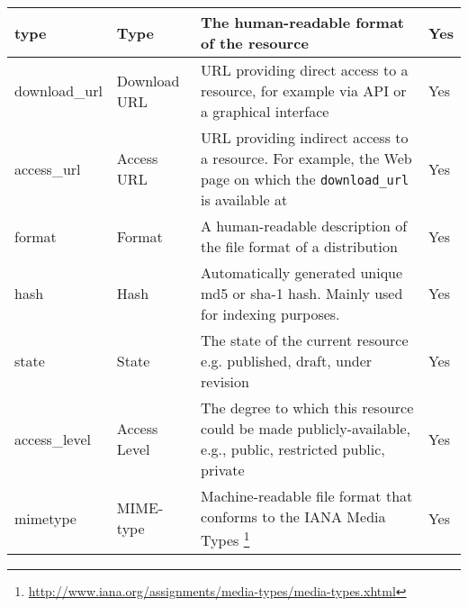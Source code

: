 \begin{center}
{\begin{longtable}[h]{|l|p{2cm}|p{9cm}|c|}
\endlastfoot
type                              & Type                             & The human-readable format of the resource                                                                                                                                                      & \multicolumn{1}{l|}{Yes}            \\ \hline
download\_url                     & Download URL                     & URL providing direct access to a resource, for example via API or a graphical interface                                                                                                         & \multicolumn{1}{l|}{Yes}            \\ \hline
access\_url                       & Access URL                       & URL providing indirect access to a resource. For example, the Web page on which the \texttt{download\_url} is available at                                                                    & \multicolumn{1}{l|}{Yes}            \\ \hline
format                            & Format                           & A human-readable description of the file format of a distribution                                                                                                                              & \multicolumn{1}{l|}{Yes}            \\ \hline
hash                              & Hash                             & Automatically generated unique md5 or sha-1 hash. Mainly used for indexing purposes.                                                                                                           & \multicolumn{1}{l|}{Yes}            \\ \hline
state                             & State                            & The state of the current resource e.g. published, draft, under revision                                                                                                                        & \multicolumn{1}{l|}{Yes}            \\ \hline
access\_level                     & Access Level                     & The degree to which this resource could be made publicly-available, e.g., public, restricted public, private                                                                                   & \multicolumn{1}{l|}{Yes}            \\ \hline
mimetype                          & MIME-type                        & Machine-readable file format that conforms to the IANA Media Types \footnote{\url{http://www.iana.org/assignments/media-types/media-types.xhtml}}                                           & \multicolumn{1}{l|}{Yes}            \\ \hline

\end{longtable}}
\end{center}
